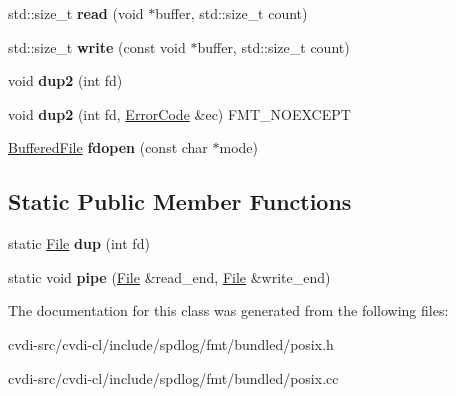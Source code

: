 \begin{DoxyCompactItemize}
\item 
std\+::size\+\_\+t {\bfseries read} (void $\ast$buffer, std\+::size\+\_\+t count)\hypertarget{classfmt_1_1File_abc5028be3839fafe1e54aa44bf94cb32}{}\label{classfmt_1_1File_abc5028be3839fafe1e54aa44bf94cb32}

\item 
std\+::size\+\_\+t {\bfseries write} (const void $\ast$buffer, std\+::size\+\_\+t count)\hypertarget{classfmt_1_1File_a0af6a258b5ca604680a83bada8a836d8}{}\label{classfmt_1_1File_a0af6a258b5ca604680a83bada8a836d8}

\item 
void {\bfseries dup2} (int fd)\hypertarget{classfmt_1_1File_a45718106d65eb24d0a44dbd6ef75865c}{}\label{classfmt_1_1File_a45718106d65eb24d0a44dbd6ef75865c}

\item 
void {\bfseries dup2} (int fd, \hyperlink{classfmt_1_1ErrorCode}{Error\+Code} \&ec) F\+M\+T\+\_\+\+N\+O\+E\+X\+C\+E\+PT\hypertarget{classfmt_1_1File_a2c15a1bef5be959578969a275d470011}{}\label{classfmt_1_1File_a2c15a1bef5be959578969a275d470011}

\item 
\hyperlink{classfmt_1_1BufferedFile}{Buffered\+File} {\bfseries fdopen} (const char $\ast$mode)\hypertarget{classfmt_1_1File_ab8f1cc502c78916df5f743900ea92ad4}{}\label{classfmt_1_1File_ab8f1cc502c78916df5f743900ea92ad4}

\end{DoxyCompactItemize}
\subsection*{Static Public Member Functions}
\begin{DoxyCompactItemize}
\item 
static \hyperlink{classfmt_1_1File}{File} {\bfseries dup} (int fd)\hypertarget{classfmt_1_1File_a2521de9e7f1ee48234ddc117689a3739}{}\label{classfmt_1_1File_a2521de9e7f1ee48234ddc117689a3739}

\item 
static void {\bfseries pipe} (\hyperlink{classfmt_1_1File}{File} \&read\+\_\+end, \hyperlink{classfmt_1_1File}{File} \&write\+\_\+end)\hypertarget{classfmt_1_1File_a84143751d0471636367eddbdf1269823}{}\label{classfmt_1_1File_a84143751d0471636367eddbdf1269823}

\end{DoxyCompactItemize}


The documentation for this class was generated from the following files\+:\begin{DoxyCompactItemize}
\item 
cvdi-\/src/cvdi-\/cl/include/spdlog/fmt/bundled/posix.\+h\item 
cvdi-\/src/cvdi-\/cl/include/spdlog/fmt/bundled/posix.\+cc\end{DoxyCompactItemize}
